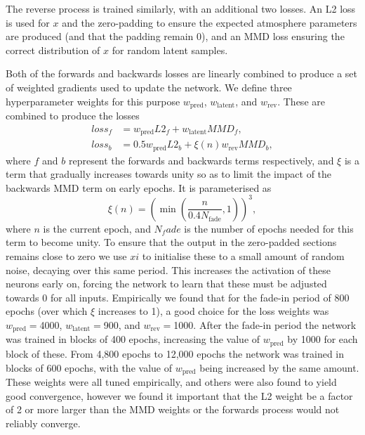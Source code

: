 The reverse process is trained similarly, with an additional two losses.
An L2 loss is used for $x$ and the zero-padding to ensure the expected atmosphere parameters are produced (and that the padding remain 0), and an MMD loss ensuring the correct distribution of $x$ for random latent samples.

Both of the forwards and backwards losses are linearly combined to produce a set of weighted gradients used to update the network.
We define three hyperparameter weights for this purpose $w_\mathrm{pred}$, $w_\mathrm{latent}$, and $w_\mathrm{rev}$.
These are combined to produce the losses
\begin{align}
    loss_f &= w_\mathrm{pred} L2_f + w_\mathrm{latent} MMD_f,\\
    loss_b &= 0.5w_\mathrm{pred} L2_b + \xi(n)w_\mathrm{rev} MMD_b,
\end{align}
where $f$ and $b$ represent the forwards and backwards terms respectively, and $\xi$ is a term that gradually increases towards unity so as to limit the impact of the backwards MMD term on early epochs.
It is parameterised as
\begin{equation}
    \xi(n) = \left( \min\left( \frac{n}{0.4 N_\mathrm{fade}}, 1 \right) \right)^3,
\end{equation}
where $n$ is the current epoch, and $N_fade$ is the number of epochs needed for this term to become unity.
To ensure that the output in the zero-padded sections remains close to zero we use $xi$ to initialise these to a small amount of random noise, decaying over this same period.
This increases the activation of these neurons early on, forcing the network to learn that these must be adjusted towards 0 for all inputs.
Empirically we found that for the fade-in period of 800 epochs (over which $\xi$ increases to 1), a good choice for the loss weights was $w_\mathrm{pred}=$4000, $w_\mathrm{latent}=$900, and $w_\mathrm{rev}=$1000.
After the fade-in period the network was trained in blocks of 400 epochs, increasing the value of $w_\mathrm{pred}$ by 1000 for each block of these.
From 4,800 epochs to 12,000 epochs the network was trained in blocks of 600 epochs, with the value of $w_\mathrm{pred}$ being increased by the same amount.
These weights were all tuned empirically, and others were also found to yield good convergence, however we found it important that the L2 weight be a factor of 2 or more larger than the MMD weights or the forwards process would not reliably converge.

